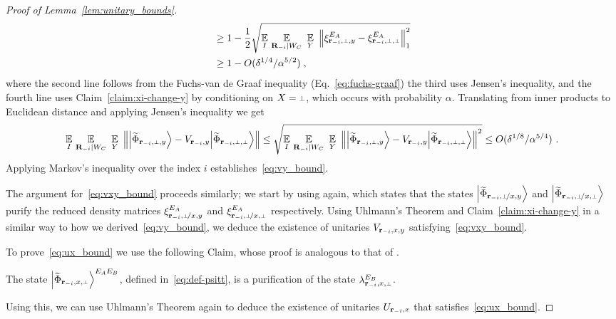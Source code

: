 \begin{proof}[Proof of Lemma~\ref{lem:unitary_bounds}]
\begin{align}
	&\geq 1 - \frac{1}{2} \sqrt {\Ex_I \, \Ex_{\bR_\mi |  W_C} \, \, \Ex_{Y}  \,\,  \Big \| \xi^{E_A}_\sspy - \xi^{E_A}_\sspp \Big \|_1^2} \notag \\
	& \geq 1 - O(\delta^{1/4}/\alpha^{5/2})\;,
\end{align}
where the second line follows from the Fuchs-van de Graaf inequality (Eq.~\eqref{eq:fuchs-graaf}) the third uses Jensen's inequality, and the fourth line uses Claim~\ref{claim:xi-change-y} by conditioning on $X = \dummy$, which occurs with probability $\alpha$. Translating from inner products to Euclidean distance and applying Jensen's inequality we get
\[
	\Ex_I \, \Ex_{\bR_\mi |  W_C} \, \, \Ex_{Y} \,\,   \left \| \bigket{\wt{\Phi}_\sspy } - V_{\br_\mi, y}  \bigket{\wt{\Phi}_\sspp}  \right \| \leq \sqrt{\Ex_I \, \Ex_{\bR_\mi |  W_C} \, \, \Ex_{Y} \,\,   \left \| \bigket{\wt{\Phi}_\sspy } - V_{\br_\mi, y}  \bigket{\wt{\Phi}_\sspp}  \right \|^2} \leq O(\delta^{1/8}/\alpha^{5/4})~.
\]
Applying Markov's inequality over the index $i$ establishes~\eqref{eq:vy_bound}.

The argument for~\eqref{eq:vxy_bound} proceeds similarly; we start by using  again, which states that the states $\bigket{\wt{\Phi}_\sspxy}$ and $\bigket{\wt{\Phi}_\sspxp}$ purify the reduced density matrices $\xi^{E_A}_\sspxy$ and $\xi^{E_A}_\sspxp$ respectively. Using Uhlmann's Theorem and Claim~\ref{claim:xi-change-y} in a similar way to how we derived~\eqref{eq:vy_bound}, we deduce the existence of unitaries $V_{{\mathbf{r}_{-i} , x,y}}$ satisfying~\eqref{eq:vxy_bound}.

To prove~\eqref{eq:ux_bound} we use the following Claim, whose proof is analogous to that of .
\begin{claim}
\label{clm:lambda-purification}
The state $\bigket{\wt{\Phi}_\ssxp}^{E_A E_B}$, defined in~\eqref{eq:def-psitt}, is a purification of the state $\lambda_\ssxp^{E_B}$. 
\end{claim}

Using this, we can use Uhlmann's Theorem again to deduce the existence of unitaries $U_{\mathbf{r}_{-i},x}$ that satisfies~\eqref{eq:ux_bound}. 


\end{proof}

